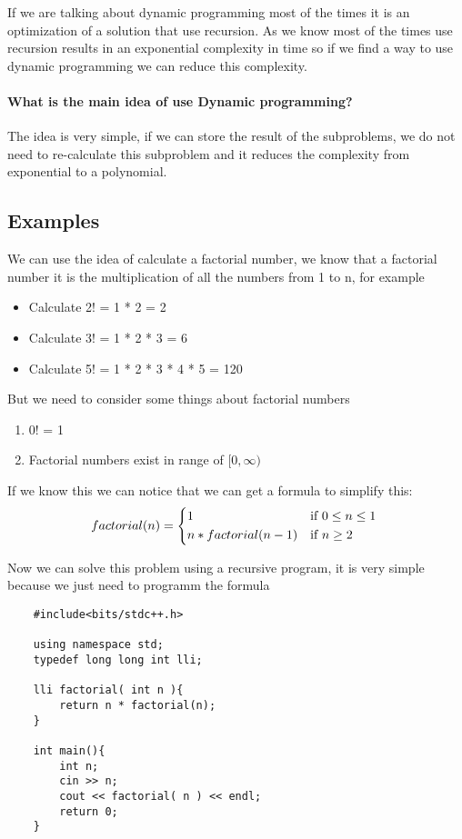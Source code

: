 If we are talking about dynamic programming most of the times it is an optimization of a solution that use recursion. As we know most of the times use recursion results in an exponential complexity in time so if we find a way to use dynamic programming we can reduce this complexity.\\

\paragraph{What is the main idea of use Dynamic programming?}
The idea is very simple, if we can store the result of the subproblems, we do not need to re-calculate this subproblem and it reduces the complexity from exponential to a polynomial. 

\subsection{Examples}
We can use the idea of calculate a factorial number, we know that a factorial number it is the multiplication of all the numbers from 1 to n, for example

\begin{itemize}
    \item { Calculate 2! = 1 * 2 = 2}
    \item { Calculate 3! = 1 * 2 * 3 = 6}
    \item { Calculate 5! = 1 * 2 * 3 * 4 * 5  = 120}
\end{itemize}

But we need to consider some things about factorial numbers
\begin{enumerate}
    \item { 0! = 1 }
    \item { Factorial numbers exist in range of $[0, \infty)$ }
\end{enumerate}

If we know this we can notice that we can get a formula to simplify this:
\[
    factorial( n ) = 
    \begin{cases*}
        1 & if $0 \leq n \leq 1$ \\
        n * factorial(n - 1) & if $n \geq 2$
    \end{cases*}
\]

Now we can solve this problem using a recursive program, it is very simple because we just need to programm the formula 
\begin{lstlisting}
    #include<bits/stdc++.h>

    using namespace std;
    typedef long long int lli;
    
    lli factorial( int n ){
        return n * factorial(n);
    }

    int main(){
        int n;
        cin >> n;
        cout << factorial( n ) << endl;
        return 0;
    }
\end{lstlisting}

